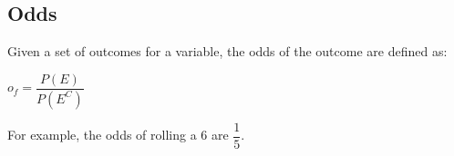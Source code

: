 
\subsection{Odds}

Given a set of outcomes for a variable, the odds of the outcome are defined as:

\(o_f=\dfrac{P(E)}{P(E^C)}\)

For example, the odds of rolling a \(6\) are \(\dfrac{1}{5}\).

